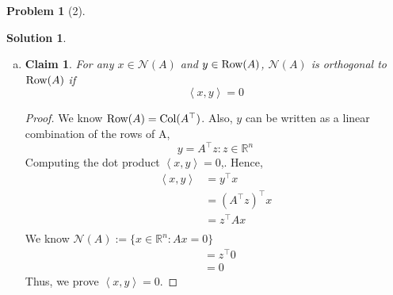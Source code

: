 \documentclass{amsart}[11pt]
\newtheorem*{claim}{Claim}
\theoremstyle{definition}
\newtheorem*{problem}{Problem}
\newtheorem{solution}{Solution}
\newcommand{\R}{\mathbb{R}}
\newcommand{\bracket}[1]{\left\langle#1\right\rangle}
\newcommand{\col}{\textnormal{Col}}
\newcommand{\row}{\textnormal{Row}}
\begin{document}
\begin{problem}[2]
\begin{solution}
\begin{enumerate}[(a)]
\begin{proof}
            \noindent Since both inclusions hold, we can conclude $\boldsymbol{\mathcal{N}(A^\top A)=\mathcal{N}(A)}$.
        \end{proof}
        \vspace{\baselineskip}
        \item \begin{claim}
        For any $x\in\mathcal{N}(A)$ and $y\in \row(A)$, $\mathcal{N}(A)$ is orthogonal to $\row(A)$ if
        \[\bracket{x,y}=0\]
        \end{claim}
        \begin{proof}
            We know $\row(A) = \col(A^\top)$. Also, $y$ can be written as a linear combination of the rows of A, 
            \[y=A^\top z : z\in\R^n\]
            Computing the dot product $\bracket{x,y} = 0$,. Hence, 
            \begin{align*}
            	\bracket{x,y} &= y^\top x \\
                &= (A^\top z)^\top x \\
                &= z^\top Ax \\
            \end{align*}
            We know $\mathcal{N}(A):=\{x\in\R^n:Ax=0\}$
            \begin{align*}
                &= z^\top 0 \\
                &= 0 
            \end{align*}
            Thus, we prove $\bracket{x,y} = 0$. 
            

\end{proof}
\end{enumerate}
\end{solution}
\end{problem}
\end{document}
